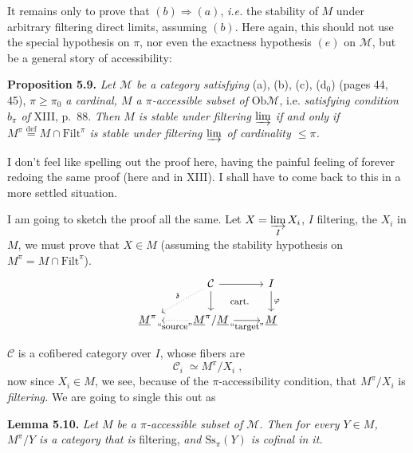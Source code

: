 \documentclass[11pt]{article}
\newcommand{\printedpage}[1]{\marginpar{\footnotesize p.~#1}}
\newcommand{\msp}[1]{\marginpar{\footnotesize [#1]}}
\newcommand{\Filt}{\mathrm{Filt}}
\newcommand{\Ob}{\mathrm{Ob}}
\newcommand{\Ss}{\mathrm{Ss}}
\newcommand{\M}{\mathcal{M}}
\newcommand{\Ci}{\mathcal{C}}
\begin{document}
It remains only to prove that $(b) \Longrightarrow (a)$, \textit{i.e.} the stability of $M$ under arbitrary filtering direct limits, assuming $(b)$. Here again, this should not use the special hypothesis on $\pi$, nor even the exactness hypothesis $(e)$ on $\M$, but be a general story of accessibility:

\textbf{Proposition 5.9.} \textit{Let $\M$ be a category satisfying} (a), (b), (c), (d$_0$) (pages 44, 45), \textit{$\pi \geq \pi_0$ a cardinal, $M$ a $\pi$-accessible subset of} $\Ob\M$, i.e. \textit{satisfying condition $b_\pi$ of} XIII, p.~88. \textit{Then $M$ is stable under filtering $\varinjlim$ if and only if $M^\pi \overset{\text{def}}{=} M \cap \Filt^\pi$ is stable under filtering $\varinjlim$ of cardinality $\leq \pi$.}

I don't feel like spelling out the proof here, having the painful feeling of forever redoing the same proof (here and in XIII). I shall have to come back to this in a more settled situation.

\msp{page 62}

I am going to sketch the proof all the same. Let $X = \varinjlim\limits_{I} X_i$, $I$ filtering, the $X_i$ in $M$, we must prove that $X \in M$ (assuming the stability hypothesis on $M^\pi = M \cap \Filt^\pi$).
\printedpage{37}
\[
\begin{tikzcd}
& \Ci \arrow[r] \arrow[d] \arrow[dl, dotted, "\mathfrak{z}"'] \arrow[dr, phantom, "\text{\footnotesize cart.}"] & I \arrow[d, "\varphi"] \\
\underline{M}^\pi & \underline{M}^\pi/\underline{M} \arrow[l, dotted, "\text{\footnotesize ``source''}"] \arrow[r, "\text{\footnotesize ``target''}"'] & \underline{M}
\end{tikzcd}
\] %

$\Ci$ is a cofibered category over $I$, whose fibers are
\[
\Ci_i \;\simeq M^\pi/X_i \;,
\]
now since $X_i \in M$, we see, because of the $\pi$-accessibility condition, that $M^\pi/X_i$ is \textit{filtering.} We are going to single this out as

\textbf{Lemma 5.10.} \textit{Let $M$ be a $\pi$-accessible subset of $\M$. Then for every $Y \in M$, $M^\pi/Y$ is a category that is} filtering, \textit{and $\Ss_\pi(Y)$ is cofinal in it.}

\msp{page 63}
\end{document}
